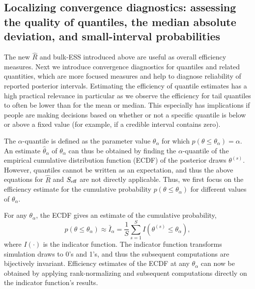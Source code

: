 \documentclass[american,]{article}
\theoremstyle{definition}
\begin{document}
\hypertarget{convergence-diagnostics-for-quantiles}{%
\subsection{Localizing convergence diagnostics: assessing the quality of quantiles, the median absolute deviation, and small-interval probabilities }\label{convergence-diagnostics-for-quantiles}}

The new \(\widehat{R}\) and bulk-ESS introduced above are useful as overall efficiency
measures. Next we introduce
convergence diagnostics for quantiles and related quantities, which are more focused measures and help to diagnose reliability of  reported
posterior intervals. Estimating
the efficiency of quantile estimates has a high practical
relevance in particular as we observe the efficiency for tail quantiles
to often be lower than for the mean or median.  This especially has implications
if people are making decisions based on whether or not a specific quantile
is below or above a fixed value (for example, if a credible interval contains zero).

The \(\alpha\)-quantile
is defined as the parameter value \(\theta_\alpha\) for which
\(p(\theta \leq \theta_\alpha) = \alpha\). An estimate
\(\hat{\theta}_\alpha\) of \(\theta_\alpha\) can thus be obtained by
finding the \(\alpha\)-quantile of the empirical cumulative distribution function (ECDF) of the
posterior draws \(\theta^{(s)}\). However, quantiles cannot be written
as an expectation, and thus the above equations for \(\widehat{R}\) and
\(S_{\rm eff}\) are not directly applicable. Thus, we first focus on the
efficiency estimate for the cumulative probability
\(p(\theta \leq \theta_\alpha)\) for different values of
\(\theta_\alpha\).

For any \(\theta_\alpha\), the ECDF gives an estimate of the cumulative
probability,
\begin{equation}
p(\theta \leq \theta_\alpha) \approx \bar{I}_\alpha = \frac{1}{S}\sum_{s=1}^S
I(\theta^{(s)} \leq\theta_\alpha),
\end{equation}
where \(I(\cdot)\) is the indicator function. The indicator function
transforms simulation draws to 0's and 1's, and thus the subsequent
computations are bijectively invariant. Efficiency estimates of the ECDF
at any \(\theta_\alpha\) can now be obtained by applying
rank-normalizing and subsequent computations directly on the indicator
function's results.
\end{document}
